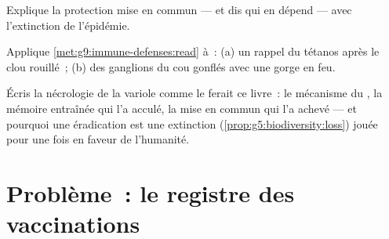 \begin{exercise}[$\star\star$]\label{exo:g9:immune-defenses:10}
Explique la protection mise en commun --- et dis qui en
dépend --- avec l'extinction de l'épidémie.
\end{exercise}

\begin{exercise}[$\star\star$]\label{exo:g9:immune-defenses:11}
Applique \cref{met:g9:immune-defenses:read} à~: (a) un
rappel du tétanos après le clou rouillé~; (b) des ganglions
du cou gonflés avec une gorge en feu.
\end{exercise}

\begin{exercise}[$\star\star\star$]\label{exo:g9:immune-defenses:12}
Écris la nécrologie de la variole comme le ferait ce livre~:
le mécanisme du , la mémoire entraînée qui l'a acculé,
la mise en commun qui l'a achevé --- et pourquoi une
éradication est une extinction
(\cref{prop:g5:biodiversity:loss}) jouée pour une fois en
faveur de l'humanité.
\end{exercise}

\section{Problème~: le registre des vaccinations}

